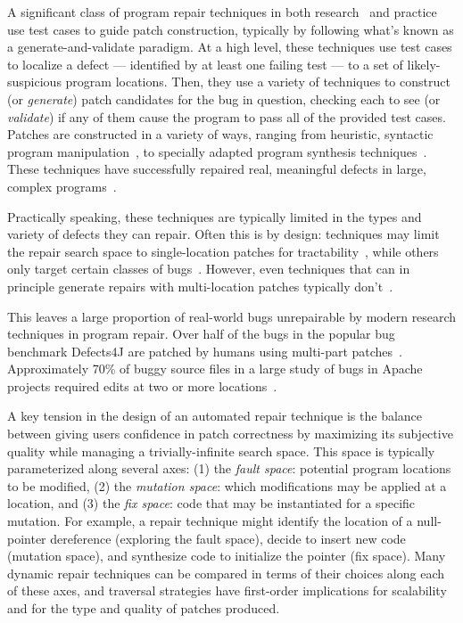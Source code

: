 \documentclass[10pt, conference]{IEEEtran}
\begin{document}
A significant class of program repair techniques in both
research~\cite{genprog,angelix,Le17, Xuan17} and practice~\cite{sapfix} use test
cases to guide patch construction, typically by following what's known as a
generate-and-validate paradigm. At a high level, these techniques use test cases
to localize a defect --- identified by at least one failing test --- to a set of
likely-suspicious program locations. Then, they use a variety of techniques to
construct (or \emph{generate}) patch candidates for the bug in question,
checking each to see (or \emph{validate}) if any of them cause the program to
pass all of the provided test cases.
%
Patches are constructed in a variety of ways, ranging from heuristic, syntactic
program manipulation~\cite{par,genprog,rsrepair,ae,prophet,hdrepair}, to specially adapted program
synthesis techniques~\cite{Konighofer11,Konighofer12,semfix,DeMarco14,angelix}. These techniques have successfully
repaired real, meaningful defects in large, complex
programs~\cite{angelix,genprog-eight-dollars,prophet,sapfix}.

Practically speaking, these techniques are typically limited in the types and
variety of defects they can repair. Often this is by design: techniques may
limit the repair search space to single-location patches for
tractability~\cite{rsrepair,ae,hdrepair}, while others only target certain
classes of bugs~\cite{Xuan17,sapfix,DeMarco14,par}. However, even techniques
that can in principle generate repairs with multi-location patches typically
don't~\cite{patch-correctness}.

This leaves a large proportion of real-world bugs unrepairable by modern
research techniques in program repair.  Over half of the bugs in the popular bug
benchmark Defects4J are patched by humans using multi-part
patches~\cite{d4j-dissection}. Approximately 70\% of buggy source files in a
large study of bugs in Apache projects required edits at two or more
locations~\cite{zhong2015}.

A key tension in the design of an automated repair technique is the balance
between giving users confidence in patch correctness by maximizing its
subjective quality while managing a trivially-infinite search space. This space
is typically parameterized along several axes: (1) the \emph{fault space}:
potential program locations to be modified, (2) the \emph{mutation space}: which
modifications may be applied at a location, and (3) the \emph{fix space}: code
that may be instantiated for a specific mutation. For example, a repair
technique might identify the location of a null-pointer dereference (exploring
the fault space), decide to insert new code (mutation space), and synthesize
code to initialize the pointer (fix space). Many dynamic repair techniques can
be compared in terms of their choices along each of these axes, and traversal
strategies have first-order implications for scalability and for the type and
quality of patches produced.
\end{document}
